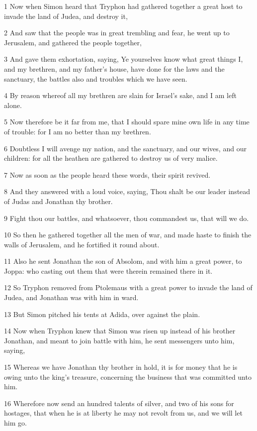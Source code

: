 \par 1 Now when Simon heard that Tryphon had gathered together a great host to invade the land of Judea, and destroy it,
\par 2 And saw that the people was in great trembling and fear, he went up to Jerusalem, and gathered the people together,
\par 3 And gave them exhortation, saying, Ye yourselves know what great things I, and my brethren, and my father's house, have done for the laws and the sanctuary, the battles also and troubles which we have seen.
\par 4 By reason whereof all my brethren are slain for Israel's sake, and I am left alone.
\par 5 Now therefore be it far from me, that I should spare mine own life in any time of trouble: for I am no better than my brethren.
\par 6 Doubtless I will avenge my nation, and the sanctuary, and our wives, and our children: for all the heathen are gathered to destroy us of very malice.
\par 7 Now as soon as the people heard these words, their spirit revived.
\par 8 And they answered with a loud voice, saying, Thou shalt be our leader instead of Judas and Jonathan thy brother.
\par 9 Fight thou our battles, and whatsoever, thou commandest us, that will we do.
\par 10 So then he gathered together all the men of war, and made haste to finish the walls of Jerusalem, and he fortified it round about.
\par 11 Also he sent Jonathan the son of Absolom, and with him a great power, to Joppa: who casting out them that were therein remained there in it.
\par 12 So Tryphon removed from Ptolemaus with a great power to invade the land of Judea, and Jonathan was with him in ward.
\par 13 But Simon pitched his tents at Adida, over against the plain.
\par 14 Now when Tryphon knew that Simon was risen up instead of his brother Jonathan, and meant to join battle with him, he sent messengers unto him, saying,
\par 15 Whereas we have Jonathan thy brother in hold, it is for money that he is owing unto the king's treasure, concerning the business that was committed unto him.
\par 16 Wherefore now send an hundred talents of silver, and two of his sons for hostages, that when he is at liberty he may not revolt from us, and we will let him go.
